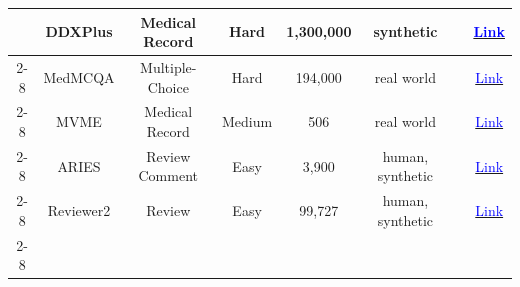 \begin{table}[!htp]
{\begin{tabular}{c|c|c|c|c|c|c|c}
                                                                                  & DDXPlus                & Medical Record          & Hard                & 1,300,000        & synthetic           & \cite{wu2023large}                                                                                                                                                              & \href{https://figshare.com/articles/dataset/DDXPlus_Dataset/20043374}{\textcolor{blue}{Link}}                                                                     \\ \cline{2-8}
                                                                                  & MedMCQA                & Multiple-Choice         & Hard                & 194,000          & real world          & \cite{tang2023medagents}                                                                                                                                                        & \href{https://medmcqa.github.io/}{\textcolor{blue}{Link}}                                                                                                         \\ \cline{2-8}
                                                                                  & MVME                   & Medical Record          & Medium              & 506              & real world          & \cite{fan2024ai}                                                                                                                                                                & \href{https://github.com/LibertFan/AI_Hospital}{\textcolor{blue}{Link}}                                                                                           \\ \cline{2-8}
                                                                                  & ARIES                  & Review Comment          & Easy                & 3,900            & human, synthetic    & \cite{d2024marg}                                                                                                                                                                & \href{https://github.com/allenai/aries}{\textcolor{blue}{Link}}                                                                                                   \\ \cline{2-8}
                                                                                  & Reviewer2              & Review                  & Easy                & 99,727           & human, synthetic    & \cite{gao2024reviewer2}                                                                                                                                                         & \href{https://huggingface.co/datasets/GitBag/Reviewer2_PGE_cleaned}{\textcolor{blue}{Link}}                                                                       \\ \cline{2-8}

\end{tabular}}
\end{table}
